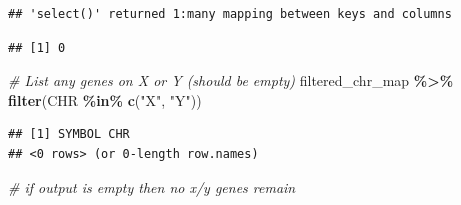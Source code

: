 \documentclass[
]{article}
\newenvironment{Shaded}{\begin{snugshade}}{\end{snugshade}}
\newcommand{\CommentTok}[1]{\textcolor[rgb]{0.56,0.35,0.01}{\textit{#1}}}
\newcommand{\FunctionTok}[1]{\textcolor[rgb]{0.13,0.29,0.53}{\textbf{#1}}}
\newcommand{\NormalTok}[1]{#1}
\newcommand{\SpecialCharTok}[1]{\textcolor[rgb]{0.81,0.36,0.00}{\textbf{#1}}}
\newcommand{\StringTok}[1]{\textcolor[rgb]{0.31,0.60,0.02}{#1}}
\begin{document}
\begin{verbatim}
## 'select()' returned 1:many mapping between keys and columns
\end{verbatim}

\begin{Shaded}
\end{Shaded}

\begin{verbatim}
## [1] 0
\end{verbatim}

\begin{Shaded}
\begin{Highlighting}[]
\CommentTok{\# List any genes on X or Y (should be empty)}
\NormalTok{filtered\_chr\_map }\SpecialCharTok{\%\textgreater{}\%} \FunctionTok{filter}\NormalTok{(CHR }\SpecialCharTok{\%in\%} \FunctionTok{c}\NormalTok{(}\StringTok{"X"}\NormalTok{, }\StringTok{"Y"}\NormalTok{))}
\end{Highlighting}
\end{Shaded}

\begin{verbatim}
## [1] SYMBOL CHR   
## <0 rows> (or 0-length row.names)
\end{verbatim}

\begin{Shaded}
\begin{Highlighting}[]
\CommentTok{\# if output is empty then no x/y genes remain}
\end{Highlighting}
\end{Shaded}
\end{document}
